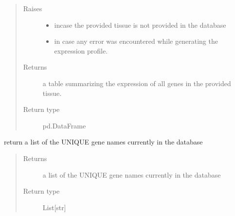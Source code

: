 \documentclass[letterpaper,10pt,english]{sphinxmanual}
\begin{document}
\begin{fulllineitems}
\begin{fulllineitems}
\begin{quote}
\begin{description}
\item[{Raises}] \leavevmode\begin{itemize}
\item {} 
 \textendash{} incase the provided tissue is not provided in the database

\item {} 
 \textendash{} in case any error was encountered while generating the expression profile.

\end{itemize}

\item[{Returns}] \leavevmode
a table summarizing the expression of all genes in the provided tissue.

\item[{Return type}] \leavevmode
pd.DataFrame

\end{description}\end{quote}

\end{fulllineitems}


\begin{fulllineitems}
\label{\detokenize{IPTK.Classes:IPTK.Classes.Database.GeneExpressionDB.get_gene_names}}
return a list of the UNIQUE gene names currently in the database
\begin{quote}\begin{description}
\item[{Returns}] \leavevmode
a list of the UNIQUE gene names currently in the database

\item[{Return type}] \leavevmode
List{[}str{]}

\end{description}\end{quote}

\end{fulllineitems}



\end{fulllineitems}
\end{document}
